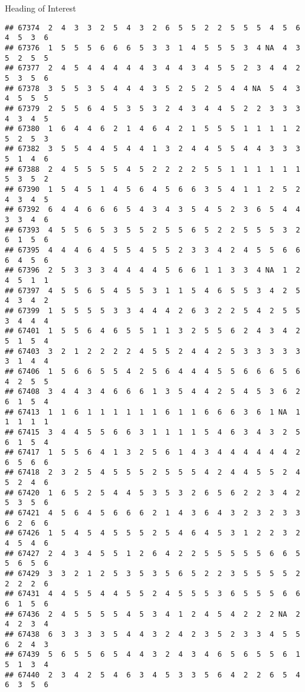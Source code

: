 \documentclass[
  ignorenonframetext,
]{beamer}
\begin{document}
\begin{frame}[fragile]{Heading of Interest}
\begin{verbatim}
## 67374  2  4  3  3  2  5  4  3  2  6  5  5  2  2  5  5  5  4  5  6  4  5  3  6
## 67376  1  5  5  5  6  6  6  5  3  3  1  4  5  5  5  3  4 NA  4  3  5  2  5  5
## 67377  2  4  5  4  4  4  4  4  3  4  4  3  4  5  5  2  3  4  4  2  5  3  5  6
## 67378  3  5  5  3  5  4  4  4  3  5  2  5  2  5  4  4 NA  5  4  3  4  5  5  5
## 67379  2  5  5  6  4  5  3  5  3  2  4  3  4  4  5  2  2  3  3  3  4  3  4  5
## 67380  1  6  4  4  6  2  1  4  6  4  2  1  5  5  5  1  1  1  1  2  5  2  5  3
## 67382  3  5  5  4  4  5  4  4  1  3  2  4  4  5  5  4  4  3  3  3  5  1  4  6
## 67388  2  4  5  5  5  5  4  5  2  2  2  2  5  5  1  1  1  1  1  1  5  3  5  2
## 67390  1  5  4  5  1  4  5  6  4  5  6  6  3  5  4  1  1  2  5  2  4  3  4  5
## 67392  6  4  4  6  6  6  5  4  3  4  3  5  4  5  2  3  6  5  4  4  3  3  4  6
## 67393  4  5  5  6  5  3  5  5  2  5  5  6  5  2  2  5  5  5  3  2  6  1  5  6
## 67395  4  4  4  6  4  5  5  4  5  5  2  3  3  4  2  4  5  5  6  6  6  4  5  6
## 67396  2  5  3  3  3  4  4  4  4  5  6  6  1  1  3  3  4 NA  1  2  4  5  1  1
## 67397  4  5  5  6  5  4  5  5  3  1  1  5  4  6  5  5  3  4  2  5  4  3  4  2
## 67399  1  5  5  5  5  3  3  4  4  4  2  6  3  2  2  5  4  2  5  5  3  4  4  4
## 67401  1  5  5  6  4  6  5  5  1  1  3  2  5  5  6  2  4  3  4  2  5  1  5  4
## 67403  3  2  1  2  2  2  2  4  5  5  2  4  4  2  5  3  3  3  3  3  3  1  4  4
## 67406  1  5  6  6  5  5  4  2  5  6  4  4  4  5  5  6  6  6  5  6  4  2  5  5
## 67408  3  4  4  3  4  6  6  6  1  3  5  4  4  2  5  4  5  3  6  2  6  1  5  4
## 67413  1  1  6  1  1  1  1  1  1  6  1  1  6  6  6  3  6  1 NA  1  1  1  1  1
## 67415  3  4  4  5  5  6  6  3  1  1  1  1  5  4  6  3  4  3  2  5  6  1  5  4
## 67417  1  5  5  6  4  1  3  2  5  6  1  4  3  4  4  4  4  4  4  2  6  5  6  6
## 67418  2  3  2  5  4  5  5  5  2  5  5  5  4  2  4  4  5  5  2  4  5  2  4  6
## 67420  1  6  5  2  5  4  4  5  3  5  3  2  6  5  6  2  2  3  4  2  5  3  5  6
## 67421  4  5  6  4  5  6  6  6  2  1  4  3  6  4  3  2  3  2  3  3  6  2  6  6
## 67426  1  5  4  5  4  5  5  5  2  5  4  6  4  5  3  1  2  2  3  2  4  5  4  6
## 67427  2  4  3  4  5  5  1  2  6  4  2  2  5  5  5  5  5  6  6  5  5  6  5  6
## 67429  3  3  2  1  2  5  3  5  3  5  6  5  2  2  3  5  5  5  5  2  2  2  2  6
## 67431  4  4  5  5  4  4  5  5  2  4  5  5  5  3  6  5  5  5  6  6  6  1  5  6
## 67436  2  4  5  5  5  5  4  5  3  4  1  2  4  5  4  2  2  2 NA  2  4  2  3  4
## 67438  6  3  3  3  3  5  4  4  3  2  4  2  3  5  2  3  3  4  5  5  6  2  4  3
## 67439  5  6  5  5  6  5  4  4  3  2  4  3  4  6  5  6  5  5  6  1  5  1  3  4
## 67440  2  3  4  2  5  4  6  3  4  5  3  3  5  6  4  2  2  6  5  4  6  3  5  6

\end{verbatim}
\end{frame}
\end{document}
